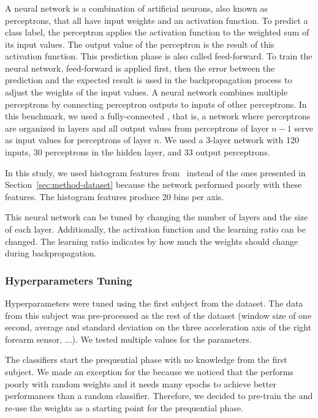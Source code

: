 \subsubsection{\FNN}
A neural network is a combination of artificial
neurons, also known as perceptrons, that all have input weights and an
activation function. To predict a class label, the
perceptron applies the activation function to the weighted sum
of its input values. The output
value of the perceptron is the result of this
activation function. This prediction phase is also
called feed-forward. To train the neural network,
feed-forward is applied first, then the error between the
prediction and the expected result is used in the
backpropagation process to adjust the weights of
the input values.  A neural network combines
multiple perceptrons by connecting perceptron outputs
to inputs of other perceptrons.  In
this benchmark, we used a fully-connected \FNN, 
that is, a network where perceptrons are organized in
layers and all output
values from perceptrons of layer $n-1$ serve as
input values for perceptrons of layer $n$. 
We used a 3-layer network with 120 inputs, 30
perceptrons in the hidden layer, and 33 output
perceptrons.

In this study, we used histogram features
from~\cite{omid_2019} instead of the ones
presented in Section~\ref{sec:method-dataset}
because the network performed
poorly with these features. The histogram features
produce 20 bins per axis.

This neural network can be tuned by changing the
number of layers and the size of each layer.
Additionally, the activation function and the
learning ratio can be changed. The learning ratio
indicates by how much the weights should change
during backpropagation.

\subsubsection{Hyperparameters Tuning}
Hyperparameters were tuned using the first
subject from the \banosdataset dataset.  The data from
this subject was pre-processed as the rest of
the \banosdataset dataset (window size of one second,
average and standard deviation on the three
acceleration axis of the right forearm sensor,
$\ldots$). We tested multiple values for the
parameters.

The
classifiers start the prequential phase with no
knowledge from the first subject.
We made an exception for the \FNN because we noticed that the
\FNN performs poorly with random weights and it
needs many epochs to achieve better performances
than a random  classifier. Therefore, we decided to
pre-train the \FNN and re-use
the weights as a starting point for the
prequential phase.

